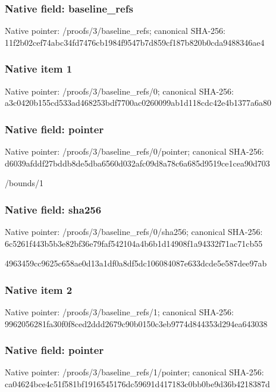 \documentclass[10pt,a4paper]{article}
\begin{document}
\subsubsection{Native field: baseline\_\allowbreak{}refs}
Native pointer: /proofs/3/baseline\_\allowbreak{}refs; canonical SHA-256: 11f2b02cef74abc34fd7476cb1984f9547b7d859cf187b820b0cda9488346ae4

\subsubsection{Native item 1}
Native pointer: /proofs/3/baseline\_\allowbreak{}refs/0; canonical SHA-256: a3c0420b155cd533ad468253bdf7700ac0260099ab1d118cdc42e4b1377a6a80

\subsubsection{Native field: pointer}
Native pointer: /proofs/3/baseline\_\allowbreak{}refs/0/pointer; canonical SHA-256: d6039afddf27bddb8de5dba6560d032afc09d8a78c6a685d9519ce1cea90d703

\begingroup\raggedright\sloppy /\allowbreak{}bounds/\allowbreak{}1\par\endgroup

\subsubsection{Native field: sha256}
Native pointer: /proofs/3/baseline\_\allowbreak{}refs/0/sha256; canonical SHA-256: 6c5261f443b5b3e82bf36e79faf542104a4b6b1d14908f1a94332f71ac71cb55

\begingroup\raggedright\sloppy 4963459cc9625c658ae0d13a1df0a8df5dc106084087e633dcde5e587dee97ab\par\endgroup

\subsubsection{Native item 2}
Native pointer: /proofs/3/baseline\_\allowbreak{}refs/1; canonical SHA-256: 9962056281fa30f0f8ced2ddd2679c90b0150c3eb9774d844353d294ea643038

\subsubsection{Native field: pointer}
Native pointer: /proofs/3/baseline\_\allowbreak{}refs/1/pointer; canonical SHA-256: ca04624bce4c51f581bf1916545176dc59691d417183c0bb0be9d36b4218387d
\end{document}
